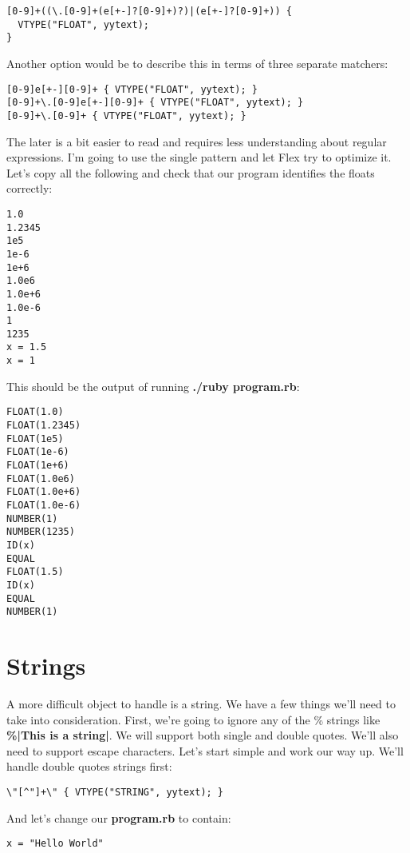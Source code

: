 {\begin{lstlisting}
[0-9]+((\.[0-9]+(e[+-]?[0-9]+)?)|(e[+-]?[0-9]+)) {
  VTYPE("FLOAT", yytext);
}
\end{lstlisting}

Another option would be to describe this in terms of three separate matchers:

\begin{lstlisting}
[0-9]e[+-][0-9]+ { VTYPE("FLOAT", yytext); }
[0-9]+\.[0-9]e[+-][0-9]+ { VTYPE("FLOAT", yytext); }
[0-9]+\.[0-9]+ { VTYPE("FLOAT", yytext); }
\end{lstlisting}

The later is a bit easier to read and requires less understanding about regular expressions. I'm going to use the single pattern and let Flex try to optimize it. Let's copy all the following and check that our program identifies the floats correctly:

\begin{lstlisting}
1.0
1.2345
1e5
1e-6
1e+6
1.0e6
1.0e+6
1.0e-6
1
1235
x = 1.5
x = 1
\end{lstlisting}

This should be the output of running {\bf ./ruby program.rb}:

\begin{lstlisting}
FLOAT(1.0)
FLOAT(1.2345)
FLOAT(1e5)
FLOAT(1e-6)
FLOAT(1e+6)
FLOAT(1.0e6)
FLOAT(1.0e+6)
FLOAT(1.0e-6)
NUMBER(1)
NUMBER(1235)
ID(x)
EQUAL
FLOAT(1.5)
ID(x)
EQUAL
NUMBER(1)
\end{lstlisting}

\section{Strings}

A more difficult object to handle is a string. We have a few things we'll need to take into consideration. First, we're going to ignore any of the \% strings like {\bf \%|This is a string|}. We will support both single and double quotes. We'll also need to support escape characters. Let's start simple and work our way up. We'll handle double quotes strings first:

\begin{lstlisting}
\"[^"]+\" { VTYPE("STRING", yytext); }
\end{lstlisting}

And let's change our {\bf program.rb} to contain:

\begin{lstlisting}
x = "Hello World"
\end{lstlisting}

}
